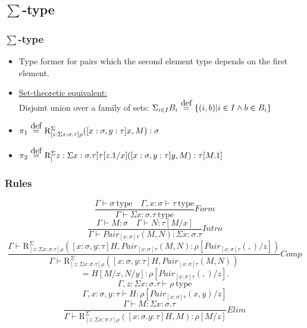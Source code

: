 \documentclass{beamer}
\newcommand{\typ}{\ \mathrm{type}}
\newcommand{\pair}[2]{Pair_{[x:\sigma]\tau}(#1, #2)}
\newcommand{\R}[2]{\mathrm{R}_{[z:\Sigma x:\sigma.\tau]\rho}^{\Sigma}(#1, #2)}
\newcommand{\C}{Comp}
\newcommand{\Intro}{Intro}
\newcommand{\F}{Form}
\newcommand{\E}{Elim}
\newcommand\defeq{\stackrel{\mathclap{\normalfont\mbox{def}}}{\ =\ }}
\begin{document}
    \subsection{$\sum$-type}
    \begin{frame}
        \frametitle{$\sum$-type}
        \begin{itemize}
            \item Type former for pairs which the second element type depends on the first element.
            \item \underline{Set-theoretic equivalent:}\\
            Disjoint union over a family of sets: $\Sigma_{i\in I}B_i \defeq \{(i,b)|i \in I \wedge b \in B_i\}$
            \item $\pi_1 \defeq \R{[x:\sigma,y:\tau]x}{M}:\sigma$
            \item $\pi_2 \defeq \mathrm{R}^\Sigma_[z:\Sigma x:\sigma.\tau]\tau[z.1/x]([x:\sigma,y:\tau]y, M):\tau[M.1]$
        \end{itemize}
    \end{frame}
    \begin{frame}
        \frametitle{Rules}
        $$\frac{\Gamma \vdash \sigma \typ \quad \Gamma,x:\sigma\vdash \tau \typ}{\Gamma\vdash \Sigma x:\sigma.\tau \typ}\F$$
        $$\frac{\Gamma \vdash M : \sigma\quad \Gamma \vdash N : \tau[M/x]}{\Gamma \vdash \pair{M}{N} : \Sigma x:\sigma.\tau}\Intro$$
        $$\frac{\Gamma \vdash \R{[x:\sigma,y:\tau]H}{\pair{M}{N}:\rho[\pair{}{}/z]}}{\Gamma \vdash \R{[x:\sigma,y:\tau]H}{\pair{M}{N}}}\C$$
        $$=H[M/x,N/y]:\rho[\pair{}{}/z].$$
        $$\Gamma,z:\Sigma x:\sigma.\tau \vdash \rho \typ$$
        $$\Gamma,x:\sigma,y:\tau\vdash H:\rho [\pair{x}{y}/z]$$
        $$\frac{\quad \Gamma \vdash M : \Sigma x:\sigma.\tau}{\Gamma \vdash \R{[x:\sigma.y:\tau]H}{M}:\rho[M/z]}\E$$
    \end{frame}
\end{document}
